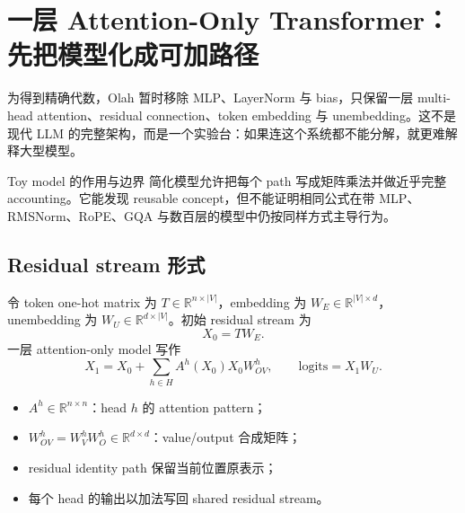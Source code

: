 \section{一层 Attention-Only Transformer：先把模型化成可加路径}

为得到精确代数，Olah 暂时移除 MLP、LayerNorm 与 bias，只保留一层 multi-head attention、residual connection、token embedding 与 unembedding。这不是现代 LLM 的完整架构，而是一个实验台：如果连这个系统都不能分解，就更难解释大型模型。


\begin{warningbox}{Toy model 的作用与边界}
简化模型允许把每个 path 写成矩阵乘法并做近乎完整 accounting。它能发现 reusable concept，但不能证明相同公式在带 MLP、RMSNorm、RoPE、GQA 与数百层的模型中仍按同样方式主导行为。
\end{warningbox}

\subsection{Residual stream 形式}

令 token one-hot matrix 为 $T\in\mathbb{R}^{n\times |V|}$，embedding 为 $W_E\in\mathbb{R}^{|V|\times d}$，unembedding 为 $W_U\in\mathbb{R}^{d\times |V|}$。初始 residual stream 为
\[
X_0=T W_E.
\]
一层 attention-only model 写作
\[
X_1=X_0+\sum_{h\in H}A^h(X_0)X_0W_{OV}^h,
\qquad
\mathrm{logits}=X_1W_U.
\]

\begin{itemize}
  \item $A^h\in\mathbb{R}^{n\times n}$：head $h$ 的 attention pattern；
  \item $W_{OV}^h=W_V^hW_O^h\in\mathbb{R}^{d\times d}$：value/output 合成矩阵；
  \item residual identity path 保留当前位置原表示；
  \item 每个 head 的输出以加法写回 shared residual stream。
\end{itemize}


